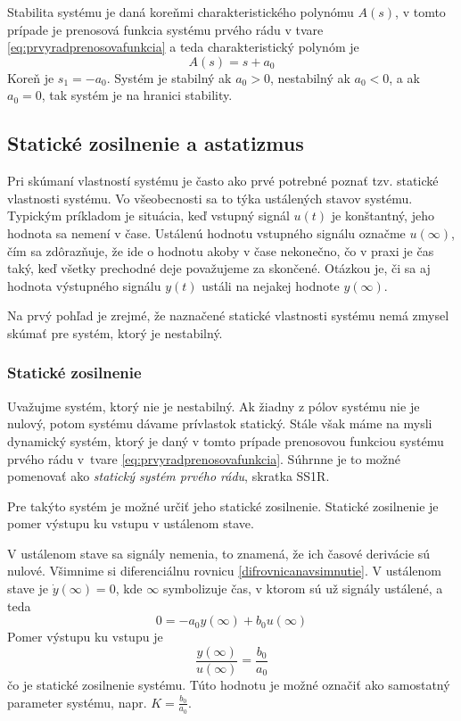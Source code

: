 \documentclass[a4paper, 10pt, ]{article}
\begin{document}
\bigskip

Stabilita systému je daná koreňmi charakteristického polynómu $A(s)$, v tomto prípade je prenosová funkcia systému prvého rádu v tvare \eqref{eq:prvyradprenosovafunkcia} a teda charakteristický polynóm je
\begin{equation}
    A(s) = s + a_0
\end{equation}
Koreň je $s_1 = -a_0$. Systém je stabilný ak $a_0 > 0$, nestabilný ak $a_0 < 0$, a ak $a_0 = 0$, tak systém je na hranici stability.




\subsection{Statické zosilnenie a astatizmus}

Pri skúmaní vlastností systému je často ako prvé potrebné poznať tzv. statické vlastnosti systému. Vo všeobecnosti sa to týka ustálených stavov systému. Typickým príkladom je situácia, keď vstupný signál $u(t)$ je konštantný, jeho hodnota sa nemení v čase. Ustálenú hodnotu vstupného signálu označme $u(\infty)$, čím sa zdôrazňuje, že ide o hodnotu akoby v čase nekonečno, čo v praxi je čas taký, keď všetky prechodné deje považujeme za skončené. Otázkou je, či sa aj hodnota výstupného signálu $y(t)$ ustáli na nejakej hodnote $y(\infty)$. 

Na prvý pohľad je zrejmé, že naznačené statické vlastnosti systému nemá zmysel skúmať pre systém, ktorý je nestabilný.


\subsubsection{Statické zosilnenie}

Uvažujme systém, ktorý nie je nestabilný. Ak žiadny z pólov systému nie je nulový, potom systému dávame prívlastok statický. Stále však máme na mysli dynamický systém, ktorý je daný v tomto prípade prenosovou funkciou systému prvého rádu v~tvare \eqref{eq:prvyradprenosovafunkcia}. Súhrnne je to možné pomenovať ako \emph{statický systém prvého rádu}, skratka SS1R.

Pre takýto systém je možné určiť jeho statické zosilnenie. Statické zosilnenie je pomer výstupu ku vstupu v ustálenom stave.

V ustálenom stave sa signály nemenia, to znamená, že ich časové derivácie sú nulové. Všimnime si diferenciálnu rovnicu \eqref{difrovnicanavsimnutie}. V ustálenom stave je $\dot y(\infty) = 0$, kde $\infty$ symbolizuje čas, v ktorom sú už signály ustálené, a teda
\begin{equation}
    0 = -a_0 y(\infty) + b_0 u(\infty)
\end{equation}
Pomer výstupu ku vstupu je
\begin{equation}
    \frac{y(\infty)}{u(\infty)} = \frac{b_0}{a_0}
\end{equation}
čo je statické zosilnenie systému. Túto hodnotu je možné označiť ako samostatný parameter systému, napr. $K = \frac{b_0}{a_0}$.
\end{document}

